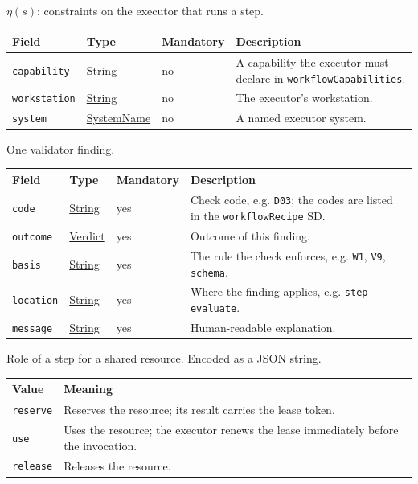 \documentclass[a4paper]{arrowhead}
\newcommand{\mref}[1]{{\textcolor{ArrowheadPurple}{\hyperref[sec:model:#1]{#1}}}}
\newcommand{\pref}[1]{{\textcolor{ArrowheadGrey}{\hyperref[sec:model:primitives:#1]{#1}}}}
\begin{document}
$\eta(s)$: constraints on the executor that runs a step.

{\small
\begin{longtable}{|p{3.7cm}|p{4.2cm}|p{1.6cm}|p{6.3cm}|}

\hline
\rowcolor{gray!33} Field & Type & Mandatory & Description \\ \hline
\endhead
\texttt{capability} & \pref{String} & no & A capability the executor must declare in \texttt{workflowCapabilities}. \\ \hline
\texttt{workstation} & \pref{String} & no & The executor's workstation. \\ \hline
\texttt{system} & \pref{SystemName} & no & A named executor system. \\ \hline
\end{longtable}
}

One validator finding.

{\small
\begin{longtable}{|p{3.7cm}|p{4.2cm}|p{1.6cm}|p{6.3cm}|}

\hline
\rowcolor{gray!33} Field & Type & Mandatory & Description \\ \hline
\endhead
\texttt{code} & \pref{String} & yes & Check code, e.g. \texttt{D03}; the codes are listed in the \texttt{workflowRecipe} SD. \\ \hline
\texttt{outcome} & \mref{Verdict} & yes & Outcome of this finding. \\ \hline
\texttt{basis} & \pref{String} & yes & The rule the check enforces, e.g. \texttt{W1}, \texttt{V9}, \texttt{schema}. \\ \hline
\texttt{location} & \pref{String} & yes & Where the finding applies, e.g. \texttt{step evaluate}. \\ \hline
\texttt{message} & \pref{String} & yes & Human-readable explanation. \\ \hline
\end{longtable}
}

Role of a step for a shared resource.
 Encoded as a JSON string.
{\small
\begin{longtable}{|p{3.9cm}|p{11.9cm}|}

\hline
\rowcolor{gray!33} Value & Meaning \\ \hline
\endhead
\texttt{reserve} & Reserves the resource; its result carries the lease token. \\ \hline
\texttt{use} & Uses the resource; the executor renews the lease immediately before the invocation. \\ \hline
\texttt{release} & Releases the resource. \\ \hline
\end{longtable}
}
\end{document}
